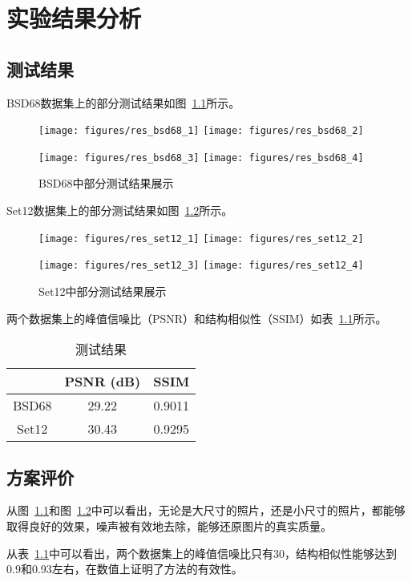 
\chapter{实验结果分析}\label{chapter:res}
\section{测试结果}
BSD68数据集上的部分测试结果如图~\ref{fig:bsd68res}所示。

\begin{figure}
	\centering
	\subcaptionbox*{}
	{\texttt{[image: figures/res\_bsd68\_1]}}
	\subcaptionbox*{}
	{\texttt{[image: figures/res\_bsd68\_2]}}
	
	\subcaptionbox*{}
	{\texttt{[image: figures/res\_bsd68\_3]}}
	\subcaptionbox*{}
	{\texttt{[image: figures/res\_bsd68\_4]}}
	\caption{BSD68中部分测试结果展示}
	\label{fig:bsd68res}
\end{figure}

Set12数据集上的部分测试结果如图~\ref{fig:set12res}所示。
\begin{figure}
	\centering
	\subcaptionbox*{}
	{\texttt{[image: figures/res\_set12\_1]}}
	\subcaptionbox*{}
	{\texttt{[image: figures/res\_set12\_2]}}
	
	\subcaptionbox*{}
	{\texttt{[image: figures/res\_set12\_3]}}
	\subcaptionbox*{}
	{\texttt{[image: figures/res\_set12\_4]}}
	\caption{Set12中部分测试结果展示}
	\label{fig:set12res}
\end{figure}


两个数据集上的峰值信噪比（PSNR）和结构相似性（SSIM）如表~\ref{table:res}所示。

\begin{table}[]
	\centering
	\caption{测试结果}
	\begin{tabular}{ccc}
		\hline
		& PSNR (dB) & SSIM \\ \hline
		BSD68 & 29.22 & 0.9011 \\
		Set12 & 30.43 & 0.9295 \\ \hline
	\end{tabular}
	\label{table:res}
\end{table}


\section{方案评价}
从图~\ref{fig:bsd68res}和图~\ref{fig:set12res}中可以看出，无论是大尺寸的照片，还是小尺寸的照片，都能够取得良好的效果，噪声被有效地去除，能够还原图片的真实质量。

从表~\ref{table:res}中可以看出，两个数据集上的峰值信噪比只有30，结构相似性能够达到0.9和0.93左右，在数值上证明了方法的有效性。